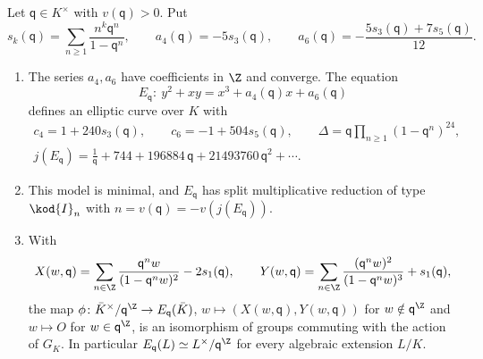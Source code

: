 \begin{theorem}[Tate]\label{thm:reduction:tate-curve}
Let $\mathsf q\in K^\times$ with $v(\mathsf q)>0$. Put
\[
s_k(\mathsf q)=\sum_{n\ge1}\frac{n^k\mathsf q^n}{1-\mathsf q^n},\qquad a_4(\mathsf q)=-5s_3(\mathsf q),\qquad
a_6(\mathsf q)=-\frac{5s_3(\mathsf q)+7s_5(\mathsf q)}{12}.
\]
\begin{enumerate}[label=(\roman*)]
\item The series $a_4,a_6$ have coefficients in $\Z$ and converge. The equation
\[
E_{\mathsf q}\colon\ y^2+xy=x^3+a_4(\mathsf q)x+a_6(\mathsf q)
\]
defines an elliptic curve over $K$ with
\begin{gather*}
c_4=1+240s_3(\mathsf q),\qquad c_6=-1+504s_5(\mathsf q),\qquad\Delta=\mathsf q\prod_{n\ge1}(1-\mathsf q^n)^{24},\\
j(E_{\mathsf q})=\frac1{\mathsf q}+744+196884\,\mathsf q+21493760\,\mathsf q^2+\cdots .
\end{gather*}
\item This model is minimal, and $E_{\mathsf q}$ has split multiplicative reduction of type $\kod{I}_n$ with
$n=v(\mathsf q)=-v(j(E_{\mathsf q}))$.
\item With
\[
X(w,\mathsf q)=\sum_{n\in\Z}\frac{\mathsf q^nw}{(1-\mathsf q^nw)^2}-2s_1(\mathsf q),\qquad
Y(w,\mathsf q)=\sum_{n\in\Z}\frac{(\mathsf q^nw)^2}{(1-\mathsf q^nw)^3}+s_1(\mathsf q),
\]
the map $\phi\colon\bar K^\times/\mathsf q^{\Z}\to E_{\mathsf q}(\bar K)$, $w\mapsto(X(w,\mathsf q),Y(w,\mathsf q))$ for $w\notin\mathsf q^{\Z}$ and
$w\mapsto O$ for $w\in\mathsf q^{\Z}$, is an isomorphism of groups commuting with the action of $G_K$. In particular
$E_{\mathsf q}(L)\simeq L^\times/\mathsf q^{\Z}$ for every algebraic extension $L/K$.
\end{enumerate}
\end{theorem}


